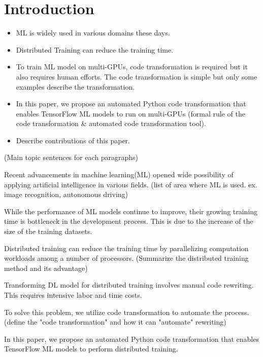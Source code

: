 \section{Introduction}\label{sec:intro}
\begin{itemize}
  \item ML is widely used in various domains these days.
  \item Distributed Training can reduce the training time.
  \item To train ML model on multi-GPUs, code transformation is required but it
    also requires human efforts. The code transformation is simple but only
    some examples describe the transformation.
  \item In this paper, we propose an automated Python code transformation that
    enables TensorFlow ML models to run on multi-GPUs (formal rule of the code
    transformation \& automated code transformation tool).
  \item Describe contributions of this paper.
\end{itemize}

(Main topic sentences for each paragraphs)

Recent advancements in machine learning(ML) opened wide possibility of
applying artificial intelligence in various fields.
(list of area where ML is used. ex. image recognition, autonomous driving)

While the performance of ML models continue to improve,
their growing training time is bottleneck in the development process.
This is due to the increase of the size of the training datasets.

Distributed training can reduce the training time 
by parallelizing computation workloads among a number of processors.
(Summarize the distributed training method and its advantage)

Transforming DL model for distributed training involves
manual code rewriting. This requires intensive labor and time costs.

To solve this problem, we utilize code transformation to automate the process.
(define the "code transformation" and how it can "automate" rewriting)

In this paper, we propose an automated Python code transformation that enables
TensorFlow ML models to perform distributed training.

